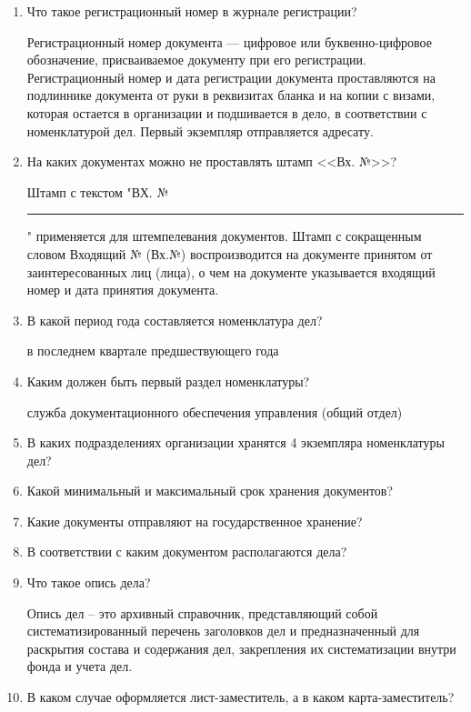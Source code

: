 \documentclass[a4paper,10pt]{article}
\theoremstyle{plain} %
\theoremstyle{definition} %
\theoremstyle{remark} %
\begin{document}
\begin{enumerate}
	\item Что такое регистрационный номер в журнале регистрации?
	
	Регистрационный номер документа — цифровое или буквенно-цифровое обозначение, присваиваемое документу при его регистрации.
	Регистрационный номер и дата регистрации документа проставляются на подлиннике документа от руки в реквизитах бланка и на копии с визами, которая остается в организации и подшивается в дело, в соответствии с номенклатурой дел. Первый экземпляр отправляется адресату.
	

	\item На каких документах можно не проставлять штамп <<Вх. №>>?
	
	Штамп с текстом "ВХ. №\rule{3em}{.1pt}" применяется для штемпелевания документов. Штамп с сокращенным словом Входящий № (Вх.№) воспроизводится на документе принятом от заинтересованных лиц (лица), о чем на документе указывается входящий номер и дата принятия документа.

	\item В какой период года составляется номенклатура дел?
	
	в последнем квартале предшествующего года

	\item Каким должен быть первый раздел номенклатуры?
	
	служба документационного обеспечения управления (общий отдел)

	\item В каких подразделениях организации хранятся 4 экземпляра номенклатуры дел?

	\item Какой минимальный и максимальный срок хранения документов?

	\item Какие документы отправляют на государственное хранение?

	\item В соответствии с каким документом располагаются дела?

	\item Что такое опись дела?
	
	Опись дел – это архивный справочник, представляющий собой
	систематизированный перечень заголовков дел и предназначенный для
	раскрытия состава и содержания дел, закрепления их систематизации внутри
	фонда и учета дел.
	

	\item В каком случае оформляется лист-заместитель, а в каком карта-заместитель?
	

\end{enumerate}
\end{document}
